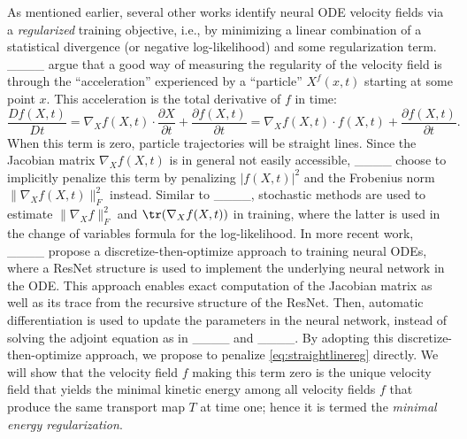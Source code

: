 
As mentioned earlier, several other works identify neural ODE velocity fields via a \textit{regularized} training objective, i.e., by minimizing a linear combination of a statistical divergence (or negative log-likelihood) and some regularization term.
%
____ argue that a good way of measuring the regularity of
the velocity field is through the ``acceleration'' experienced by a ``particle'' $X^f(x,t)$ starting at some point $x$. This acceleration is the total derivative of $f$ in time: 
\begin{equation}\label{eq:straightlinereg}
  \frac{ D f(X,t)}{D t} = \nabla_X f(X,t) \cdot \frac{ \partial X}{ \partial t} + \frac{\partial f(X,t)}{ \partial t} = \nabla_X f(X,t) \cdot f(X,t) + \frac{\partial f(X,t)}{\partial t}.
\end{equation}
When this term is zero, particle trajectories will be straight lines. Since the Jacobian matrix $\nabla_X f(X,t)$ is
in general not easily accessible, ____ choose to
implicitly penalize this term by penalizing $|f(X,t)|^2$ and the
Frobenius norm $\|\nabla_X f(X,t)\|_F^2$ instead. Similar to
____, stochastic methods are used  to
estimate $\|\nabla_X f\|_F^2$ and $\tr(\nabla_X f(X,t))$ in training, where the latter is used in the change of variables formula for the log-likelihood. In more recent work, ____ propose a discretize-then-optimize
approach to training neural ODEs, where a ResNet structure is used to
implement the underlying neural network in the ODE. This approach
enables exact computation of the Jacobian matrix as well as its trace
from the recursive structure of the ResNet. Then, automatic
differentiation is used to update the parameters in the neural
network, instead of solving the adjoint equation as in ____
and ____. By adopting this discretize-then-optimize approach, we propose to penalize \eqref{eq:straightlinereg} directly. We will show that the velocity field $f$ making this term zero is the unique velocity field that yields the minimal kinetic energy among all velocity fields $f$ that produce the same transport map $T$ at time one; hence it is termed the \textit{minimal energy regularization}. 



